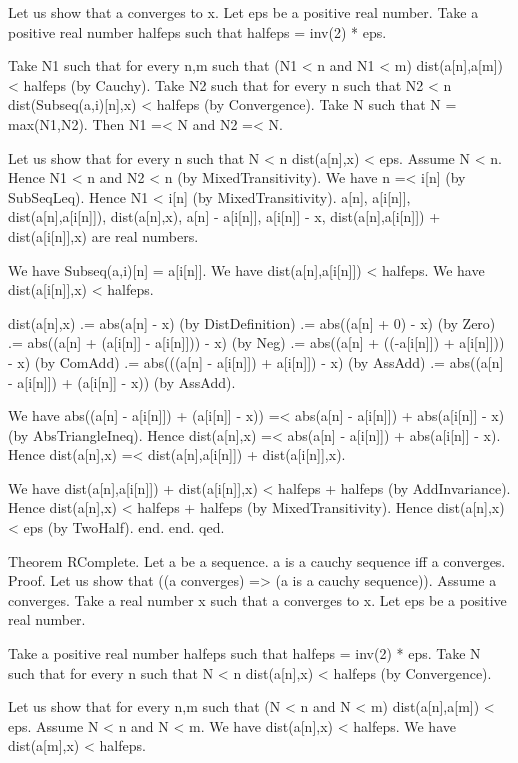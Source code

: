 \documentclass{article}
\newenvironment{forthel}{\begin{leftbar}}{\end{leftbar}}
\begin{document}
\begin{forthel}
	Let us show that a converges to x.
	Let eps be a positive real number.
	Take a positive real number halfeps such that halfeps = inv(2) * eps.
	
	Take N1 such that for every n,m such that (N1 < n and N1 < m) dist(a[n],a[m]) < halfeps (by Cauchy).
	Take N2 such that for every n such that N2 < n dist(Subseq(a,i)[n],x) < halfeps (by Convergence).
	Take N such that N = max(N1,N2).
	Then N1 =< N and N2 =< N.
	
	Let us show that for every n such that N < n dist(a[n],x) < eps.
	Assume N < n. Hence N1 < n and N2 < n (by MixedTransitivity).
	We have n =< i[n] (by SubSeqLeq). Hence N1 < i[n] (by MixedTransitivity).
	a[n], a[i[n]], dist(a[n],a[i[n]]), dist(a[n],x), a[n] - a[i[n]], a[i[n]] - x, dist(a[n],a[i[n]]) + dist(a[i[n]],x) are real numbers.
	
	We have Subseq(a,i)[n] = a[i[n]].
	We have dist(a[n],a[i[n]]) < halfeps.
	We have dist(a[i[n]],x) < halfeps.
	
	dist(a[n],x) .= abs(a[n] - x) (by DistDefinition)
	.= abs((a[n] + 0) - x) (by Zero)
	.= abs((a[n] + (a[i[n]] - a[i[n]])) - x) (by Neg)
	.= abs((a[n] + ((-a[i[n]]) + a[i[n]])) - x) (by ComAdd)
	.= abs(((a[n] - a[i[n]]) + a[i[n]]) - x) (by AssAdd)
	.= abs((a[n] - a[i[n]]) + (a[i[n]] - x)) (by AssAdd).
	
	We have abs((a[n] - a[i[n]]) + (a[i[n]] - x)) =< abs(a[n] - a[i[n]]) + abs(a[i[n]] - x) (by AbsTriangleIneq).
	Hence dist(a[n],x) =< abs(a[n] - a[i[n]]) + abs(a[i[n]] - x).
	Hence dist(a[n],x) =< dist(a[n],a[i[n]]) + dist(a[i[n]],x).
	
	We have dist(a[n],a[i[n]]) + dist(a[i[n]],x) < halfeps + halfeps (by AddInvariance).
	Hence dist(a[n],x) < halfeps + halfeps (by MixedTransitivity).
	Hence dist(a[n],x) < eps (by TwoHalf).
	end.
	end.
	qed.
	
	Theorem RComplete.
	Let a be a sequence. a is a cauchy sequence iff a converges.
	Proof.
	Let us show that ((a converges) => (a is a cauchy sequence)).
	Assume a converges.
	Take a real number x such that a converges to x.
	Let eps be a positive real number.
	
	Take a positive real number halfeps such that halfeps = inv(2) * eps.
	Take N such that for every n such that N < n dist(a[n],x) < halfeps (by Convergence).
	
	Let us show that for every n,m such that (N < n and N < m) dist(a[n],a[m]) < eps.
	Assume N < n and N < m.
	We have dist(a[n],x) < halfeps.
	We have dist(a[m],x) < halfeps.
	

\end{forthel}
\end{document}
